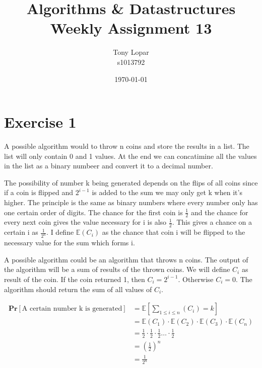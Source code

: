 \documentclass{article}
\begin{document}
\title{Algorithms \& Datastructures \\ Weekly Assignment 13}
\date{\today}
\author{Tony Lopar \\ s1013792}
\maketitle
\section*{Exercise 1}
A possible algorithm would to throw n coins and store the results in a list. The list will only contain 0 and 1 values. At the end we can concatimine all the values in the list as a binary numbeer and convert it to a decimal number.

The possibility of number k being generated depends on the flips of all coins since if a coin is flipped and $2^{i - 1}$ is added to the sum we may only get k when it's higher. The principle is the same as binary numbers where every number only has one certain order of digits. The chance for the first coin is $\frac{1}{2}$ and the chance for every next coin gives the value necessary for i is also $\frac{1}{2}$. This gives a chance on a certain i as $\frac{1}{2^n}$. I define $\mathbb{E}(C_i)$ as the chance that coin i will be flipped to the necessary value for the sum which forms i.

A possible algorithm could be an algorithm that throws n coins. The output of the algorithm will be a sum of results of the thrown coins. We will define $C_i$ as result of the coin. If the coin returned 1, then $C_i = 2^{i - 1}$. Otherwise $C_i = 0$. The algorithm should return the sum of all values of $C_i$.

\begin{align*}
  \textbf{Pr}[\text{A certain number k is generated}] &= \mathbb{E}
  \left[
    \sum_{1 \leq i \leq n}(C_i) = k
  \right] \\
  &= \mathbb{E} ( C_1 ) \cdot \mathbb{E} ( C_2) \cdot \mathbb{E} ( C_3) \cdot \mathbb{E} ( C_n) \\
  &= \frac{1}{2} \cdot \frac{1}{2} \cdot \frac{1}{2} \dots \cdot \frac{1}{2} \\
  &= \left( \frac{1}{2} \right)^n \\
  &= \frac{1}{2^n}
\end{align*}
\end{document}
